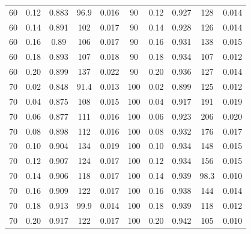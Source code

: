 \documentclass[12pt]{article}
\begin{document}
\begin{spacing}{2.0}
\begin{table}[h!]
\begin{tabular}{c c | c | c c ||c c | c | c c |}
				60	&	0.12	&	0.883	&	96.9	&	0.016	&	90	&	0.12	&	0.927	&	128	&	0.014	\\
				60	&	0.14	&	0.891	&	102	&	0.017	&	90	&	0.14	&	0.928	&	126	&	0.014	\\
				60	&	0.16	&	0.89	&	106	&	0.017	&	90	&	0.16	&	0.931	&	138	&	0.015	\\
				60	&	0.18	&	0.893	&	107	&	0.018	&	90	&	0.18	&	0.934	&	107	&	0.012	\\
				60	&	0.20	&	0.899	&	137	&	0.022	&	90	&	0.20	&	0.936	&	127	&	0.014	\\
				70	&	0.02	&	0.848	&	91.4	&	0.013	&	100	&	0.02	&	0.899	&	125	&	0.012	\\
				70	&	0.04	&	0.875	&	108	&	0.015	&	100	&	0.04	&	0.917	&	191	&	0.019	\\
				70	&	0.06	&	0.877	&	111	&	0.016	&	100	&	0.06	&	0.923	&	206	&	0.020	\\
				70	&	0.08	&	0.898	&	112	&	0.016	&	100	&	0.08	&	0.932	&	176	&	0.017	\\
				70	&	0.10	&	0.904	&	134	&	0.019	&	100	&	0.10	&	0.934	&	148	&	0.015	\\
				70	&	0.12	&	0.907	&	124	&	0.017	&	100	&	0.12	&	0.934	&	156	&	0.015	\\
				70	&	0.14	&	0.906	&	118	&	0.017	&	100	&	0.14	&	0.939	&	98.3	&	0.010	\\
				70	&	0.16	&	0.909	&	122	&	0.017	&	100	&	0.16	&	0.938	&	144	&	0.014	\\
				70	&	0.18	&	0.913	&	99.9	&	0.014	&	100	&	0.18	&	0.939	&	118	&	0.012	\\
				70	&	0.20	&	0.917	&	122	&	0.017	&	100	&	0.20	&	0.942	&	105	&	0.010	\\
				\hline
			\end{tabular}
			\end{table}



\end{spacing}
\end{document}

